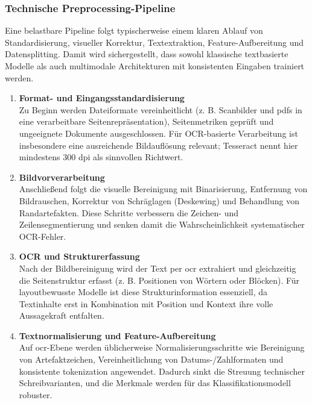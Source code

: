 \subsubsection{Technische Preprocessing-Pipeline}

Eine belastbare Pipeline folgt typischerweise einem klaren Ablauf von Standardisierung, visueller Korrektur, Textextraktion, Feature-Aufbereitung und Datensplitting. 
Damit wird sichergestellt, dass sowohl klassische textbasierte Modelle als auch multimodale Architekturen mit konsistenten Eingaben trainiert werden. \cite{shaip2025dokumentenklassifizierung} \cite{layoutlmv2_2021}

\begin{enumerate}
    \item \textbf{Format- und Eingangsstandardisierung} \\ Zu Beginn werden Dateiformate vereinheitlicht (z. B. Scanbilder und \acrshort{pdf}s in eine verarbeitbare Seitenrepräsentation), Seitenmetriken geprüft und ungeeignete Dokumente ausgeschlossen. Für OCR-basierte Verarbeitung ist insbesondere eine ausreichende Bildauflösung relevant; Tesseract nennt hier mindestens 300 dpi als sinnvollen Richtwert. \cite{tesseract_improve_quality}
    \item \textbf{Bildvorverarbeitung} \\ Anschließend folgt die visuelle Bereinigung mit Binarisierung, Entfernung von Bildrauschen, Korrektur von Schräglagen (Deskewing) und Behandlung von Randartefakten. Diese Schritte verbessern die Zeichen- und Zeilensegmentierung und senken damit die Wahrscheinlichkeit systematischer OCR-Fehler. \cite{tesseract_improve_quality}
    \item \textbf{OCR und Strukturerfassung} \\ Nach der Bildbereinigung wird der Text per \acrshort{ocr} extrahiert und gleichzeitig die Seitenstruktur erfasst (z. B. Positionen von Wörtern oder Blöcken). Für layoutbewusste Modelle ist diese Strukturinformation essenziell, da Textinhalte erst in Kombination mit Position und Kontext ihre volle Aussagekraft entfalten. \cite{huggingface_layoutlm} \cite{layoutlm_2020}
    \item \textbf{Textnormalisierung und Feature-Aufbereitung} \\ Auf \acrshort{ocr}-Ebene werden üblicherweise Normalisierungsschritte wie Bereinigung von Artefaktzeichen, Vereinheitlichung von Datums-/Zahlformaten und konsistente \gls{tokenization} angewendet. Dadurch sinkt die Streuung technischer Schreibvarianten, und die Merkmale werden für das Klassifikationsmodell robuster. \cite{shaip2025dokumentenklassifizierung}

\end{enumerate}
